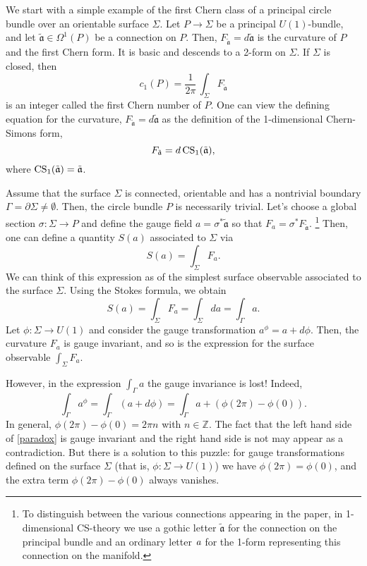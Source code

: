 \documentclass[11pt]{report}
\theoremstyle{plain}
\theoremstyle{definition}
\theoremstyle{remark}
\theoremstyle{remark}
\numberwithin{equation}{section}
\begin{document}
		We start with a simple example of the first Chern class of a principal circle bundle over an orientable surface $\Sigma$. Let $P \to \Sigma$ be a principal $U(1)$-bundle, and let $\mathfrak{\tilde{a}}\in \Omega^1(P)$ be a connection on $P$. Then, $F_\mathfrak{\tilde{a}} = d\mathfrak{\tilde{a}}$ is the curvature of $P$ and the first Chern form. It is basic and descends to a 2-form on $\Sigma$. If $\Sigma$ is closed, then
%
$$
c_1(P) = \frac{1}{2\pi} \, \int_\Sigma F_\mathfrak{\tilde{a}} 
$$
is an integer called the first Chern number of $P$. One can view the defining equation for the curvature, $F_\mathfrak{\tilde{a}} = d \mathfrak{\tilde{a}}$ as the definition of the 1-dimensional Chern-Simons form,
%
$$
F_\mathfrak{\tilde{a}}= d \,  {\rm CS}_1(\mathfrak{\tilde{a}}),
$$
where ${\rm CS}_1(\mathfrak{\tilde{a}})=\mathfrak{\tilde{a}}$.

Assume that the surface $\Sigma$ is connected, orientable and has a nontrivial boundary $\Gamma= \partial \Sigma \neq \emptyset$. Then, the circle bundle $P$ is necessarily trivial. Let's choose a global section $\sigma: \Sigma \to P$ and define the gauge field $a = \sigma^* \mathfrak{\tilde{a}}$ so that $F_a = \sigma^* F_\mathfrak{\tilde{a}}$. \footnote{To distinguish between the various connections appearing in the paper, in 1-dimensional CS-theory we use a gothic letter $\mathfrak{\tilde{a}}$ for the connection on the principal bundle and an ordinary letter $\it{a}$ for the 1-form representing this connection on the manifold.} Then, one can define a  quantity $S(a)$ associated to $\Sigma$ via
%
$$
S(a)= \int_\Sigma F_a.
$$
We can think of this expression as of the simplest surface observable associated to the surface $\Sigma$. Using the Stokes formula, we obtain
%
\begin{equation}  \label{paradox}
S(a)= \int_\Sigma  F_a = \int_\Sigma da = \int_{\Gamma} a.
\end{equation}
Let $\phi: \Sigma \to U(1)$ and consider the gauge transformation $a^\phi=a+d\phi$. Then, the curvature $F_a$ is gauge invariant, and so is the expression for the surface observable $\int_\Sigma F_a$.  

However, in the expression $\int_\Gamma a$ the gauge invariance is lost! Indeed,
%
$$
\int_\Gamma a^\phi = \int_\Gamma (a + d\phi) = \int_\Gamma a + \left( \phi(2\pi) - \phi(0) \right).
$$
In general, $\phi(2\pi) - \phi(0) = 2\pi n$ with $n \in \mathbb{Z}$. The fact that the left hand side of \eqref{paradox} is gauge invariant and the right hand side is not may appear as a contradiction. But there is a solution to this puzzle: for gauge transformations defined on the surface $\Sigma$ (that is, $\phi: \Sigma \to U(1)$) we have $\phi(2\pi) = \phi(0)$, and the extra term $\phi(2\pi) - \phi(0)$ always vanishes.
\end{document}
